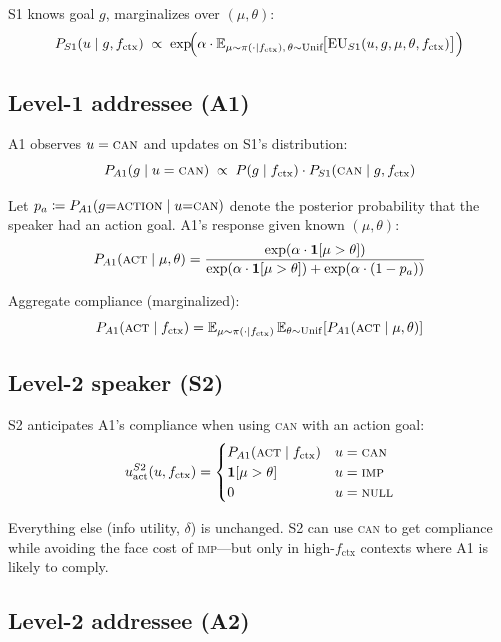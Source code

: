 \documentclass[11pt]{article}
\begin{document}
S1 knows goal $g$, marginalizes over $(\mu, \theta)$:
\[
  P_{S1}(u \mid g, f_{\text{ctx}}) \;\propto\;
  \exp\!\Bigl(\alpha\cdot \mathbb{E}_{\mu \sim \pi(\cdot|f_{\text{ctx}}),\, \theta \sim \mathrm{Unif}}\!\bigl[\mathrm{EU}_{S1}(u, g, \mu, \theta, f_{\text{ctx}})\bigr]\Bigr)
\]

\subsection{Level-1 addressee (A1)}

A1 observes $u = \textsc{can}$ and updates on S1's distribution:
\[
  P_{A1}(g \mid u = \textsc{can}) \;\propto\; P(g \mid f_{\text{ctx}})\cdot P_{S1}(\textsc{can} \mid g, f_{\text{ctx}})
\]

Let $p_a \coloneqq P_{A1}(g{=}\textsc{action} \mid u{=}\textsc{can})$ denote the posterior probability that the speaker had an action goal. A1's response given known $(\mu, \theta)$:
\[
  P_{A1}(\textsc{act} \mid \mu, \theta) =
  \frac{\exp(\alpha\cdot\mathbf{1}[\mu > \theta])}
       {\exp(\alpha\cdot\mathbf{1}[\mu > \theta]) + \exp(\alpha\cdot(1 - p_a))}
\]

Aggregate compliance (marginalized):
\[
  P_{A1}(\textsc{act} \mid f_{\text{ctx}}) =
  \mathbb{E}_{\mu \sim \pi(\cdot|f_{\text{ctx}})}\,
  \mathbb{E}_{\theta \sim \mathrm{Unif}}\!\left[P_{A1}(\textsc{act} \mid \mu, \theta)\right]
\]

\subsection{Level-2 speaker (S2)}

S2 anticipates A1's compliance when using \textsc{can} with an action goal:
\[
  u_{\text{act}}^{S2}(u, f_{\text{ctx}}) =
  \begin{cases}
    P_{A1}(\textsc{act} \mid f_{\text{ctx}}) & u = \textsc{can} \\
    \mathbf{1}[\mu > \theta] & u = \textsc{imp} \\
    0 & u = \textsc{null}
  \end{cases}
\]

Everything else (info utility, $\delta$) is unchanged. S2 can use \textsc{can}
to get compliance while avoiding the face cost of \textsc{imp}---but only in
high-$f_{\text{ctx}}$ contexts where A1 is likely to comply.

\subsection{Level-2 addressee (A2)}
\end{document}
